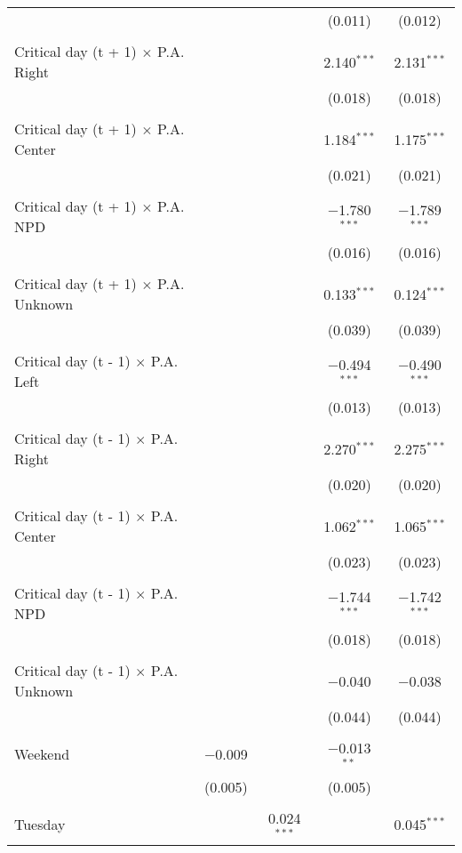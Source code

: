 \documentclass[
]{article}
\begin{document}
\begin{table}[!htbp]
{\begin{tabular}{@{\extracolsep{5pt}}lcccc}
  &  &  & (0.011) & (0.012) \\ 
  & & & & \\ 
 Critical day (t + 1) $\times$ P.A. Right &  &  & 2.140$^{***}$ & 2.131$^{***}$ \\ 
  &  &  & (0.018) & (0.018) \\ 
  & & & & \\ 
 Critical day (t + 1) $\times$ P.A. Center &  &  & 1.184$^{***}$ & 1.175$^{***}$ \\ 
  &  &  & (0.021) & (0.021) \\ 
  & & & & \\ 
 Critical day (t + 1) $\times$ P.A. NPD &  &  & $-$1.780$^{***}$ & $-$1.789$^{***}$ \\ 
  &  &  & (0.016) & (0.016) \\ 
  & & & & \\ 
 Critical day (t + 1) $\times$ P.A. Unknown &  &  & 0.133$^{***}$ & 0.124$^{***}$ \\ 
  &  &  & (0.039) & (0.039) \\ 
  & & & & \\ 
 Critical day (t - 1) $\times$ P.A. Left &  &  & $-$0.494$^{***}$ & $-$0.490$^{***}$ \\ 
  &  &  & (0.013) & (0.013) \\ 
  & & & & \\ 
 Critical day (t - 1) $\times$ P.A. Right &  &  & 2.270$^{***}$ & 2.275$^{***}$ \\ 
  &  &  & (0.020) & (0.020) \\ 
  & & & & \\ 
 Critical day (t - 1) $\times$ P.A. Center &  &  & 1.062$^{***}$ & 1.065$^{***}$ \\ 
  &  &  & (0.023) & (0.023) \\ 
  & & & & \\ 
 Critical day (t - 1) $\times$ P.A. NPD &  &  & $-$1.744$^{***}$ & $-$1.742$^{***}$ \\ 
  &  &  & (0.018) & (0.018) \\ 
  & & & & \\ 
 Critical day (t - 1) $\times$ P.A. Unknown &  &  & $-$0.040 & $-$0.038 \\ 
  &  &  & (0.044) & (0.044) \\ 
  & & & & \\ 
 Weekend & $-$0.009 &  & $-$0.013$^{**}$ &  \\ 
  & (0.005) &  & (0.005) &  \\ 
  & & & & \\ 
 Tuesday &  & 0.024$^{***}$ &  & 0.045$^{***}$ \\ 

\end{tabular}}
\end{table}
\end{document}
